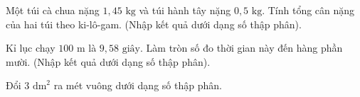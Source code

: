 \begin{ex} %
Một túi cà chua nặng $1{,}45\text{ kg}$ và túi hành tây nặng $0{,}5\text{ kg}$. Tính tổng cân nặng của hai túi theo ki-lô-gam. (Nhập kết quả dưới dạng số thập phân).
\end{ex}

\begin{ex} %
Kỉ lục chạy $100\text{ m}$ là $9{,}58\text{ giây}$. Làm tròn số đo thời gian này đến hàng phần mười. (Nhập kết quả dưới dạng số thập phân).
\end{ex}

\begin{ex} %
Đổi $3\text{ dm}^2$ ra mét vuông dưới dạng số thập phân.
\end{ex}
